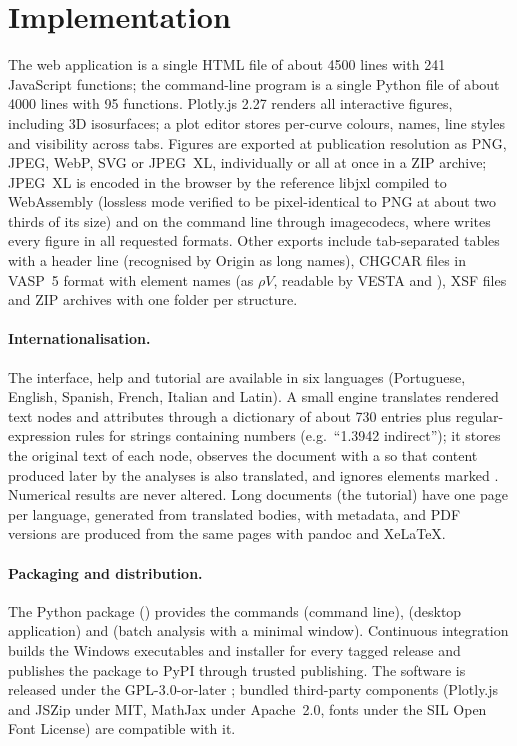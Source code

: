 \section{Implementation}\label{sec:impl}
The web application is a single HTML file of about 4500 lines with 241 JavaScript functions; the command-line program is a single Python file of about 4000 lines with 95 functions. Plotly.js 2.27 renders all interactive figures, including 3D isosurfaces; a plot editor stores per-curve colours, names, line styles and visibility across tabs. Figures are exported at publication resolution as PNG, JPEG, WebP, SVG or JPEG~XL, individually or all at once in a ZIP archive; JPEG~XL is encoded in the browser by the reference libjxl compiled to WebAssembly (lossless mode verified to be pixel-identical to PNG at about two thirds of its size) and on the command line through imagecodecs, where  writes every figure in all requested formats. Other exports include tab-separated tables with a header line (recognised by Origin as long names), CHGCAR files in VASP~5 format with element names (as $\rho V$, readable by VESTA and ), XSF files and ZIP archives with one folder per structure.

\paragraph{Internationalisation.} The interface, help and tutorial are available in six languages (Portuguese, English, Spanish, French, Italian and Latin). A small engine translates rendered text nodes and attributes through a dictionary of about 730 entries plus regular-expression rules for strings containing numbers (e.g.\ ``1.3942 indirect''); it stores the original text of each node, observes the document with a  so that content produced later by the analyses is also translated, and ignores elements marked . Numerical results are never altered. Long documents (the tutorial) have one page per language, generated from translated bodies, with  metadata, and PDF versions are produced from the same pages with pandoc and XeLaTeX.

\paragraph{Packaging and distribution.} The Python package () provides the commands  (command line),  (desktop application) and  (batch analysis with a minimal window). Continuous integration builds the Windows executables and installer for every tagged release and publishes the package to PyPI through trusted publishing. The software is released under the GPL-3.0-or-later \cite{gplv3}; bundled third-party components (Plotly.js and JSZip under MIT, MathJax under Apache~2.0, fonts under the SIL Open Font License) are compatible with it.

